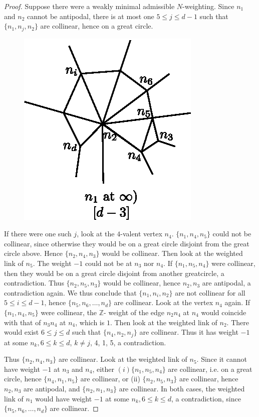 \begin{proof}
Suppose there were a weakly minimal admissible $N$-weighting. Since
$n_1$ and $n_2$ cannot be antipodal, there is at most one $5 \leq j
\leq d -1$ such that $\{n_1, n_j, n_2\}$ are collinear, hence on a
great circle. 
\begin{figure}[H]
\centering 
\includegraphics{vol58-fig/fig58-43.eps} 
\end{figure}

If there were one such $j$, look at the $4$-valent
vertex $n_4$. $\{n_1, n_4, n_5\}$ could not be collinear, since
otherwise they would be on a great circle disjoint from the great
circle above. Hence $\{n_2, n_4, n_3\}$ would be collinear. Then look
at the weighted link of $n_5$. The weight $-1$ could not be at $n_3$
nor $n_4$. If $\{n_1, n_5, n_4\}$ were collinear, then they would be
on a great circle disjoint from another great\pageoriginale circle, a
contradiction. Thus $\{n_2, n_5, n_3\}$ would be collinear, hence
$n_2, n_3$ are antipodal, a contradiction again. We thus conclude that
$\{n_1, n_i, n_2 \}$ are not collinear for all $5 \leq i \leq d-1$,
hence $\{n_5, n_6, \ldots , n_d\}$ are collinear. Look at the vertex
$n_4$ again. If $\{n_1, n_4, n_5 \}$ were collinear, the $\mathbb{Z}$-
weight of the edge $n_2n_4$ at $n_4$ would coincide with that of
$n_3n_4$ at $n_4$, which is $1$. Then look at the weighted link of
$n_2$. There would exist $6 \leq j \leq d$ such that $\{n_4, n_2,
n_j\}$ are collinear. Thus it has weight $-1$ at some $n_k, 6 \leq k
\leq d$, $k \neq j$, 4, 1, 5, a contradiction. 

Thus $\{n_2, n_4, n_3\}$ are collinear. Look at the weighted link of
$n_5$. Since it cannot have weight $-1$ at $n_3$ and $n_4$, either
$(i) \{n_1, n_5, n_4\}$ are collinear, i.e. on a great circle, hence
$\{n_4, n_1, n_5 \}$ are collinear, or (ii) $\{n_2, n_5, n_3\}$ are
collinear, hence $n_2, n_3$ are antipodal, and $\{n_2, n_1, n_3\}$ are
collinear. In both cases, the weighted link of $n_1$ would have weight
$-1$ at some $n_k, 6 \leq k \leq d$, a contradiction, since $\{n_5,
n_6, \ldots, n_d\}$ are collinear. 
\end{proof}

